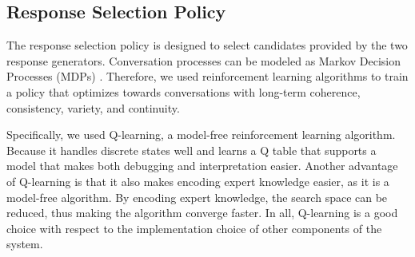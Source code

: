 \documentclass[11pt]{article}
\newcommand{\dk}[1]{{\color{red} #1}}
\begin{document}
\subsection{Response Selection Policy}
The response selection policy is designed to select candidates provided by the two response generators. Conversation processes can be modeled as Markov Decision Processes (MDPs) \cite{williams2007partially}. Therefore, we used reinforcement learning algorithms to train a policy that optimizes towards conversations with long-term coherence, consistency, variety, and continuity. %
\begin{comment}
\begin{figure*}[htbp]
\begin{equation}
Q_{t+1}(s_{t},a_{t}) \leftarrow {Q_t(s_t,a_t)} + \alpha_t(s_t,a_t) \cdot \left( R_{t+1} + \gamma \max_{a}Q_t(s_{t+1}, a) - Q_t(s_t,a_t) \right)
\end{equation}
\end{figure*}
\end{comment}
Specifically, we used Q-learning, a model-free reinforcement learning algorithm. Because it handles discrete states well and learns a Q table that supports a model that makes both debugging and interpretation easier. Another advantage of Q-learning is that it also makes encoding expert knowledge easier, as it is a model-free algorithm. By encoding expert knowledge, the search space can be reduced, thus making the algorithm converge faster. In all, Q-learning is a good choice with respect to the implementation choice of other components of the system.
\end{document}
